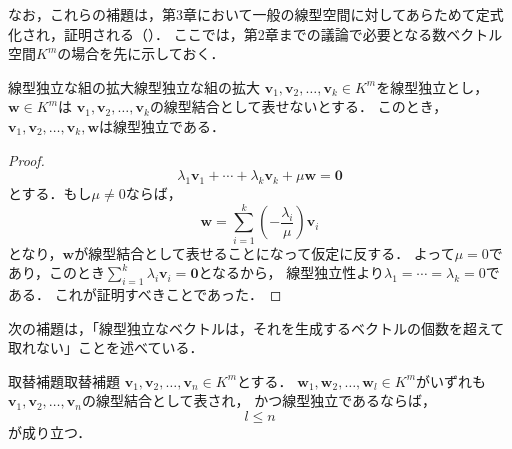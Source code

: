 なお，これらの補題は，第3章において一般の線型空間に対してあらためて定式化され，証明される（）．
ここでは，第2章までの議論で必要となる数ベクトル空間$K^m$の場合を先に示しておく．

\begin{lemma}{線型独立な組の拡大}{線型独立な組の拡大}
  $\bm{v}_1, \bm{v}_2, \dots, \bm{v}_k \in K^m$を線型独立とし，$\bm{w} \in K^m$は
  $\bm{v}_1, \bm{v}_2, \dots, \bm{v}_k$の線型結合として表せないとする．
  このとき，$\bm{v}_1, \bm{v}_2, \dots, \bm{v}_k, \bm{w}$は線型独立である．
\end{lemma}

\begin{leftbar}
\begin{proof}
  \[
    \lambda_1 \bm{v}_1 + \cdots + \lambda_k \bm{v}_k + \mu \bm{w} = \bm{0}
  \]
  とする．もし$\mu \ne 0$ならば，
  \[
    \bm{w} = \sum_{i=1}^{k} \left(-\frac{\lambda_i}{\mu}\right) \bm{v}_i
  \]
  となり，$\bm{w}$が線型結合として表せることになって仮定に反する．
  よって$\mu = 0$であり，このとき$\sum_{i=1}^{k} \lambda_i \bm{v}_i = \bm{0}$となるから，
  線型独立性より$\lambda_1 = \cdots = \lambda_k = 0$である．
  これが証明すべきことであった．
\end{proof}
\end{leftbar}

次の補題は，「線型独立なベクトルは，それを生成するベクトルの個数を超えて取れない」ことを述べている．

\begin{lemma}{取替補題}{取替補題}
  $\bm{v}_1, \bm{v}_2, \dots, \bm{v}_n \in K^m$とする．
  $\bm{w}_1, \bm{w}_2, \dots, \bm{w}_l \in K^m$がいずれも$\bm{v}_1, \bm{v}_2, \dots, \bm{v}_n$の線型結合として表され，
  かつ線型独立であるならば，
  \[
    l \le n
  \]
  が成り立つ．
\end{lemma}


